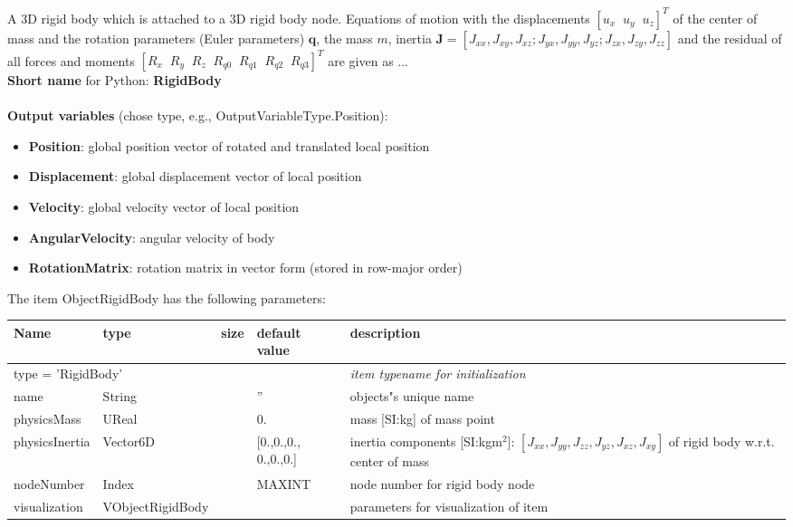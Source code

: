 A 3D rigid body which is attached to a 3D rigid body node. Equations of motion with the displacements $[u_x\;\; u_y\;\; u_z]^T$ of the center of mass and the rotation parameters (Euler parameters) $\mathbf{q}$, the mass $m$, inertia $\mathbf{J} = [J_{xx}, J_{xy}, J_{xz}; J_{yx}, J_{yy}, J_{yz}; J_{zx}, J_{zy}, J_{zz}]$ and the residual of all forces and moments $[R_x\;\; R_y\;\; R_z\;\; R_{q0}\;\; R_{q1}\;\; R_{q2}\;\; R_{q3}]^T$ are given as ...
 \\
{\bf Short name} for Python: {\bf RigidBody}
 \\\\ 
{\bf Output variables} (chose type, e.g., OutputVariableType.Position): 
\begin{itemize}
    \item {\bf Position}: global position vector of rotated and translated local position
    \item {\bf Displacement}: global displacement vector of local position
    \item {\bf Velocity}: global velocity vector of local position
    \item {\bf AngularVelocity}: angular velocity of body
    \item {\bf RotationMatrix}: rotation matrix in vector form (stored in row-major order)
\end{itemize}
The item ObjectRigidBody has the following parameters:
\begin{center}
  \footnotesize
  \begin{longtable}{| p{4.5cm} | p{2.5cm} | p{0.5cm} | p{2.5cm} | p{6cm} |}
    \hline
    \bf Name & \bf type & \bf size & \bf default value & \bf description \\ \hline
    \multicolumn{4}{l}{\parbox{10cm}{type = 'RigidBody'}} & \multicolumn{1}{l}{\parbox{6cm}{\it item typename for initialization}}\\ \hline
    name &     String &      &     '' &     objects"s unique name\\ \hline
    physicsMass &     UReal &      &     0. &     mass [SI:kg] of mass point\\ \hline
    physicsInertia &     Vector6D &      &     [0.,0.,0., 0.,0.,0.] &     inertia components [SI:kgm$^2$]: $[J_{xx}, J_{yy}, J_{zz}, J_{yz}, J_{xz}, J_{xy}]$ of rigid body w.r.t. center of mass\\ \hline
    nodeNumber &     Index &      &     MAXINT &     node number for rigid body node\\ \hline
    visualization & VObjectRigidBody & & & parameters for visualization of item \\ \hline
	  \end{longtable}
	\end{center}
